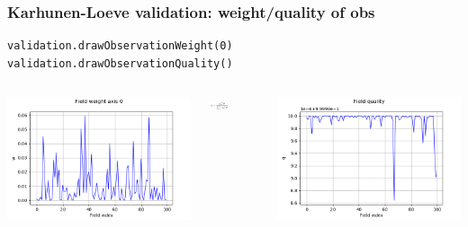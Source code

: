 \documentclass{beamer}
\begin{document}
\begin{frame}[containsverbatim]
\frametitle{Karhunen-Loeve validation: weight/quality of obs}
% 
% 
\begin{lstlisting}
validation.drawObservationWeight(0)
validation.drawObservationQuality()
\end{lstlisting}

\begin{columns}
\begin{center}
\includegraphics[width=1.0\textwidth]{figures/kl4.png}
\end{center}
\begin{center}
\includegraphics[width=0.4\textwidth]{figures/klwei.png}
\end{center}
\begin{center}
\includegraphics[width=1.0\textwidth]{figures/kl5.png}

\end{center}
\end{columns}
\end{frame}
\end{document}
